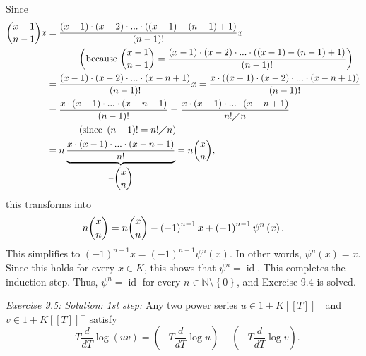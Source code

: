 \documentclass[numbers=enddot,12pt,final,onecolumn,notitlepage]{scrartcl}%
\begin{document}
Since%
\begin{align*}
\dbinom{x-1}{n-1}x  &  =\dfrac{\left(  x-1\right)  \cdot\left(  x-2\right)
\cdot...\cdot\left(  \left(  x-1\right)  -\left(  n-1\right)  +1\right)
}{\left(  n-1\right)  !}x\\
&  \ \ \ \ \ \ \ \ \ \ \left(  \text{because }\dbinom{x-1}{n-1}=\dfrac{\left(
x-1\right)  \cdot\left(  x-2\right)  \cdot...\cdot\left(  \left(  x-1\right)
-\left(  n-1\right)  +1\right)  }{\left(  n-1\right)  !}\right) \\
&  =\dfrac{\left(  x-1\right)  \cdot\left(  x-2\right)  \cdot...\cdot\left(
x-n+1\right)  }{\left(  n-1\right)  !}x=\dfrac{x\cdot\left(  \left(
x-1\right)  \cdot\left(  x-2\right)  \cdot...\cdot\left(  x-n+1\right)
\right)  }{\left(  n-1\right)  !}\\
&  =\dfrac{x\cdot\left(  x-1\right)  \cdot...\cdot\left(  x-n+1\right)
}{\left(  n-1\right)  !}=\dfrac{x\cdot\left(  x-1\right)  \cdot...\cdot\left(
x-n+1\right)  }{n!\diagup n}\\
&  \ \ \ \ \ \ \ \ \ \ \left(  \text{since }\left(  n-1\right)  !=n!\diagup
n\right) \\
&  =n\underbrace{\dfrac{x\cdot\left(  x-1\right)  \cdot...\cdot\left(
x-n+1\right)  }{n!}}_{=\dbinom{x}{n}}=n\dbinom{x}{n},
\end{align*}
this transforms into%
\[
n\dbinom{x}{n}=n\dbinom{x}{n}-\left(  -1\right)  ^{n-1}x+\left(  -1\right)
^{n-1}\psi^{n}\left(  x\right)  .
\]
This simplifies to $\left(  -1\right)  ^{n-1}x=\left(  -1\right)  ^{n-1}%
\psi^{n}\left(  x\right)  $. In other words, $\psi^{n}\left(  x\right)  =x$.
Since this holds for every $x\in K$, this shows that $\psi^{n}%
=\operatorname*{id}$. This completes the induction step. Thus, $\psi
^{n}=\operatorname*{id}$ for every $n\in\mathbb{N}\setminus\left\{  0\right\}
$, and Exercise 9.4 is solved.

\textit{Exercise 9.5: Solution:} \textit{1st step:} Any two power series
$u\in1+K\left[  \left[  T\right]  \right]  ^{+}$ and $v\in1+K\left[  \left[
T\right]  \right]  ^{+}$ satisfy%
\begin{equation}
-T\dfrac{d}{dT}\log\left(  uv\right)  =\left(  -T\dfrac{d}{dT}\log u\right)
+\left(  -T\dfrac{d}{dT}\log v\right)  . \label{9.ex5.s1}%
\end{equation}
\end{document}
